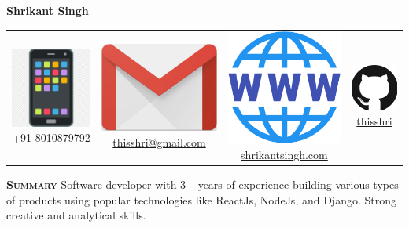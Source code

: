 \documentclass[11pt, a4paper]{article}
\begin{document}
\begin{center}
    \textbf{{\huge Shrikant Singh}}
\end{center}
\begin{center}
    \begin{tabular}{ c | c | c | c}
        \includegraphics[height=.018\textwidth]{phone} \href{tel:+918010879792}{+91-8010879792} &
        \includegraphics[height=.018\textwidth]{gmail} \href{mailto:thisshri@gmail.com} {thisshri@gmail.com} &
        \includegraphics[height=.018\textwidth]{web} \href{https://shrikantsingh.com} {shrikantsingh.com}&
        \includegraphics[height=.018\textwidth]{github} \href{https://github.com/thisshri} {thisshri} \\
    \end{tabular}
\end{center}

\begin{flushleft}
    \uline{\textsc{\large{\textbf{Summary}}}\hfill}
    \newline
    \newline
    Software developer with 3+ years of experience building various types of products using popular technologies like ReactJs, NodeJs, and Django. Strong creative and analytical skills.
\end{flushleft}
\end{document}

